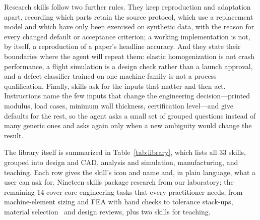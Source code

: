 \documentclass[11pt]{article}
\begin{document}
Research skills follow two further rules. They keep reproduction and adaptation apart, recording
which parts retain the source protocol, which use a replacement model and which have only been
exercised on synthetic data, with the reason for every changed default or acceptance criterion; a
working implementation is not, by itself, a reproduction of a paper's headline accuracy. And they state
their boundaries where the agent will repeat them: elastic homogenization is not crash performance, a
flight simulation is a design check rather than a launch approval, and a defect classifier trained on
one machine family is not a process qualification. Finally, skills ask for the inputs that matter and
then act. Instructions name the few inputs that change the engineering decision---printed modulus,
load cases, minimum wall thickness, certification level---and give defaults for the rest, so the agent
asks a small set of grouped questions instead of many generic ones and asks again only when a new
ambiguity would change the result.

The library itself is summarized in Table~\ref{tab:library}, which lists all 33 skills, grouped into design and CAD, analysis and simulation,
manufacturing, and teaching. Each row gives the skill's icon and name and, in plain language, what
a user can ask for. Nineteen skills package research from our laboratory; the remaining 14 cover
core engineering tasks that every practitioner needs, from machine-element sizing and FEA with hand
checks to tolerance stack-ups, material selection~\cite{ashby2011} and design reviews, plus two
skills for teaching.
\end{document}
